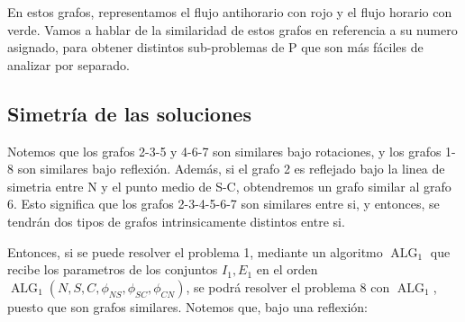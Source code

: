 \documentclass[12pt,twoside]{article}
\begin{document}
\begin{center}
	\end{center}
	\hspace{1cm} En estos grafos, representamos el flujo antihorario con rojo y el flujo horario con verde. Vamos a hablar de la similaridad de estos grafos en referencia a su numero asignado, para obtener distintos sub-problemas de P que son m\'as f\'aciles de analizar por separado.
	
	\subsection{Simetr\'ia de las soluciones}
	\hspace{1cm} Notemos que los grafos 2-3-5 y 4-6-7 son similares bajo rotaciones, y los grafos 1-8 son similares bajo reflexi\'on. Adem\'as, si el grafo 2 es reflejado bajo la linea de simetria entre N y el punto medio de S-C, obtendremos un grafo similar al grafo 6. Esto significa que los grafos 2-3-4-5-6-7 son similares entre si, y entonces, se tendr\'an dos tipos de grafos intrinsicamente distintos entre si.
	
	\hspace{1cm} Entonces, si se puede resolver el problema 1, mediante un algoritmo \(\operatorname{ALG}_1\) que recibe los parametros de los conjuntos \(I_1,E_1\) en el orden \(\operatorname{ALG}_1(N,S,C,\phi_{NS},\phi_{SC},\phi_{CN})\), se podr\'a resolver el problema 8 con \(\operatorname{ALG}_1\), puesto que son grafos similares. Notemos que, bajo una reflexi\'on:
	
\end{document}
